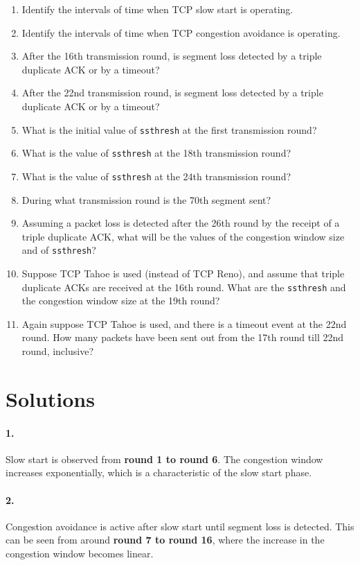 \documentclass{cshwk}
\begin{document}
\begin{enumerate}
    \item Identify the intervals of time when TCP slow start is operating.
    \item Identify the intervals of time when TCP congestion avoidance is operating.
    \item After the 16th transmission round, is segment loss detected by a triple duplicate ACK or by a timeout?
    \item After the 22nd transmission round, is segment loss detected by a triple duplicate ACK or by a timeout?
    \item What is the initial value of \texttt{ssthresh} at the first transmission round?
    \item What is the value of \texttt{ssthresh} at the 18th transmission round?
    \item What is the value of \texttt{ssthresh} at the 24th transmission round?
    \item During what transmission round is the 70th segment sent?
    \item Assuming a packet loss is detected after the 26th round by the receipt of a triple duplicate ACK, what will be the values of the congestion window size and of \texttt{ssthresh}?
    \item Suppose TCP Tahoe is used (instead of TCP Reno), and assume that triple duplicate ACKs are received at the 16th round. What are the \texttt{ssthresh} and the congestion window size at the 19th round?
    \item Again suppose TCP Tahoe is used, and there is a timeout event at the 22nd round. How many packets have been sent out from the 17th round till 22nd round, inclusive?
\end{enumerate}

\section*{Solutions}

\paragraph{1.} Slow start is observed from \textbf{round 1 to round 6}. The congestion window increases exponentially, which is a characteristic of the slow start phase.

\paragraph{2.} Congestion avoidance is active after slow start until segment loss is detected. This can be seen from around \textbf{round 7 to round 16}, where the increase in the congestion window becomes linear.
\end{document}
